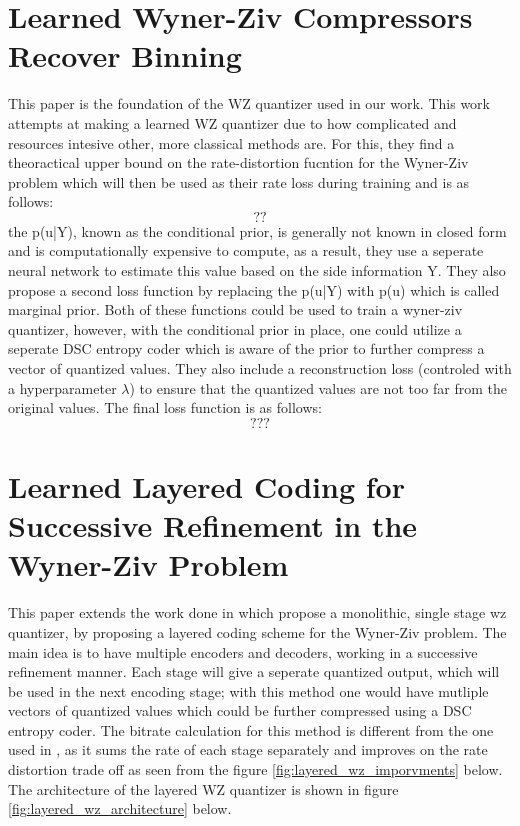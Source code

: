 \section{Learned Wyner-Ziv Compressors Recover Binning \cite{OzyilkanRecoverBinning}}
This paper is the foundation of the WZ quantizer used in our work. This work attempts at making a learned WZ quantizer due to how complicated and resources intesive other, more classical methods are.
For this, they find a theoractical upper bound on the rate-distortion fucntion for the Wyner-Ziv problem which will then be used as their rate loss during training and is as follows:
\begin{equation}
    ??
\end{equation}
the p(u|Y), known as the conditional prior, is generally not known in closed form and is computationally expensive to compute, as a result, they use a seperate neural network to estimate this value based on the side information Y. They also propose a second loss function by replacing the p(u|Y) with p(u) which is called marginal prior. Both of these functions could be used to train a wyner-ziv quantizer, however, with the conditional prior in place, one could utilize a seperate DSC entropy coder which is aware of the prior to further compress a vector of quantized values.
They also include a reconstruction loss (controled with a hyperparameter $\lambda$) to ensure that the quantized values are not too far from the original values. The final loss function is as follows:
\begin{equation}
    ???
\end{equation}

\section{Learned Layered Coding for Successive Refinement in the Wyner-Ziv Problem \cite{JoukovskyLayeredWZ}}
This paper extends the work done in \cite{OzyilkanRecoverBinning} which propose a monolithic, single stage wz quantizer, by proposing a layered coding scheme for the Wyner-Ziv problem. The main idea is to have multiple encoders and decoders, working in a successive refinement manner. Each stage will give a seperate quantized output, which will be used in the next encoding stage; with this method one would have mutliple vectors of quantized values which could be further compressed using a DSC entropy coder. The bitrate calculation for this method is different from the one used in \cite{OzyilkanRecoverBinning}, as it sums the rate of each stage separately and improves on the rate distortion trade off as seen from the figure \ref{fig:layered_wz_imporvments} below. The architecture of the layered WZ quantizer is shown in figure \ref{fig:layered_wz_architecture} below.

